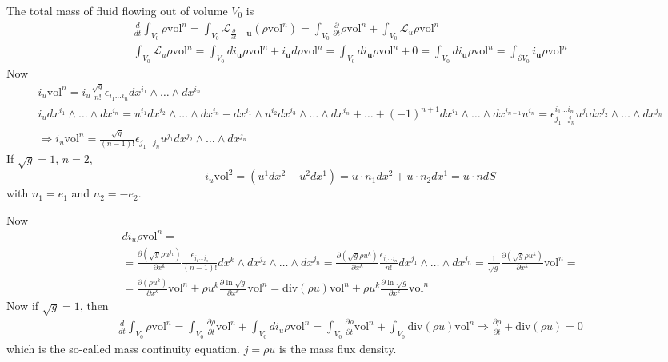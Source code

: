 \documentclass[twoside,landscape,10pt]{amsart}
\theoremstyle{plain}
\theoremstyle{definition}
\theoremstyle{remark}
\theoremstyle{remark}
\begin{document}
\begin{multicols*}{2}
The total mass of fluid flowing out of volume $V_0$ is 
\[
\begin{gathered}
  \frac{d}{dt} \int_{V_0} \rho \text{vol}^n = \int_{V_0} \mathcal{L}_{\frac{\partial}{\partial t} + \textbf{u}} (\rho \text{vol}^n) = \int_{V_0} \frac{ \partial }{\partial t} \rho \text{vol}^n + \int_{V_0} \mathcal{L}_u \rho \text{vol}^n   \\
 \int_{V_0} \mathcal{L}_u \rho \text{vol}^n = \int_{V_0} di_{\mathbf{u}} \rho \text{vol}^n  + i_{\mathbf{u}} d\rho \text{vol}^n = \int_{V_0} di_{\mathbf{u}} \rho \text{vol}^n + 0 = \int_{V_0} di_{\mathbf{u}} \rho \text{vol}^n = \int_{\partial V_0} i_{\mathbf{u}} \rho \text{vol}^n
\end{gathered}
\]  
Now
\[
\begin{gathered}
  i_u \text{vol}^n = i_u\frac{\sqrt{g}}{n!} \epsilon_{i_1 \dots i_n} dx^{i_1} \wedge \dots \wedge dx^{i_n} \\ 
  i_u dx^{i_1} \wedge \dots \wedge dx^{i_n} = u^{i_1} dx^{i_2} \wedge \dots \wedge dx^{i_n} - dx^{i_1} \wedge u^{i_2} dx^{i_3} \wedge \dots \wedge dx^{i_n} +  \dots + (-1)^{n+1} dx^{i_1} \wedge \dots \wedge dx^{i_{n-1}} u^{i_n} = \epsilon^{i_1 \dots i_n}_{j_1 \dots j_n } u^{j_1 } dx^{j_2} \wedge \dots \wedge dx^{j_n}  \\
\Longrightarrow i_u\text{vol}^n = \frac{ \sqrt{g}}{ (n-1)!} \epsilon_{j_1 \dots j_n} u^{j_1} dx^{j_2} \wedge \dots \wedge dx^{j_n}
\end{gathered} 
\]
If $\sqrt{g} = 1$, $n=2$, 
\[
i_u \text{vol}^2 = (u^1 dx^2 - u^2 dx^1) = u\cdot n_1 dx^2 + u\cdot n_2 dx^1 = u\cdot n dS
\]
with $n_1 =e_1$ and $n_2=-e_2$.  

Now 
\[
\begin{gathered}
  di_u \rho \text{vol}^n = \\
  = \frac{ \partial ( \sqrt{g} \rho u^{j_1} ) }{ \partial x^k} \frac{ \epsilon_{j_1 \dots j_n} }{ (n-1)! } dx^k \wedge dx^{j_2} \wedge \dots \wedge dx^{j_n} = \frac{ \partial (\sqrt{ g} \rho u^k) }{ \partial x^k} \frac{ \epsilon_{j_1 \dots j_n }}{ n!} dx^{j_1} \wedge \dots \wedge dx^{j_n} = \frac{1}{\sqrt{g}} \frac{ \partial (\sqrt{g} \rho u^k)}{ \partial x^k} \text{vol}^n = \\
  = \frac{ \partial (\rho u^k)}{ \partial x^k} \text{vol}^n + \rho u^k \frac{ \partial \ln{ \sqrt{g}}}{ \partial x^k} \text{vol}^n = \text{div}(\rho u) \text{vol}^n + \rho u^k \frac{ \partial \ln{ \sqrt{g}}}{ \partial x^k} \text{vol}^n
\end{gathered}
\]
Now if $\sqrt{g}=1$, then 
\[
\begin{gathered}
  \frac{d}{dt} \int_{V_0} \rho \text{vol}^n = \int_{V_0} \frac{ \partial \rho }{ \partial t} \text{vol}^n + \int_{V_0} di_u \rho \text{vol}^n = \int_{V_0} \frac{ \partial \rho }{ \partial t} \text{vol}^n + \int_{V_0} \text{div}(\rho u) \text{vol}^n \Longrightarrow \frac{ \partial \rho}{\partial t} + \text{div}(\rho u) = 0
\end{gathered}
\]
which is the so-called mass continuity equation.  $ j = \rho u$ is the mass flux density.  


\end{multicols*}
\end{document}
